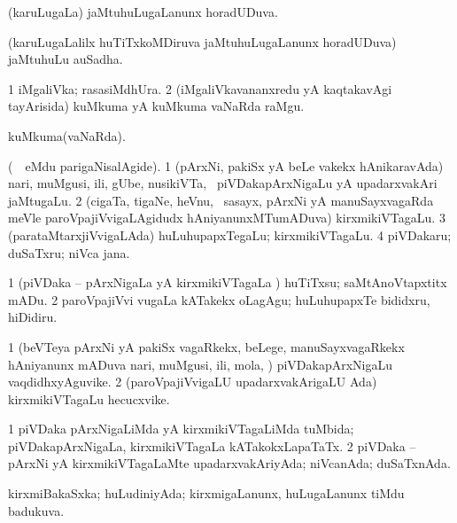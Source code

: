 \bentry
{} 
\gl{\gu}
\expl{}
\bmng
 (karuLugaLa) jaMtuhuLugaLanunx horadUDuva. 
\emng
\eentry

\bentry
{} 
\gl{\nA}
\expl{}
\bmng
 (karuLugaLalilx huTiTxkoMDiruva jaMtuhuLugaLanunx horadUDuva) jaMtuhuLu auSadha. 
\emng
\eentry

\bentry
{} 
\gl{\nA}
\expl{}
\bmng
\bnum
\num{1} iMgaliVka; rasasiMdhUra. 
\num{2} (iMgaliVkavananxredu yA kaqtakavAgi tayArisida) kuMkuma yA kuMkuma vaNaRda raMgu. 
\enum
\emng
\eentry

\bentry
{} 
\gl{\gu}
\expl{}
\bmng
 kuMkuma(vaNaRda). 
\emng
\eentry

\bentry
{} 
\gl{\nA}
\expl{}
\bmng
 (\sA\ \bava\ eMdu parigaNisalAgide). 
\bnum
\num{1} (pArxNi, pakiSx yA beLe \mo vakekx hAnikaravAda) nari, muMgusi, ili, gUbe, nusikiVTa, \mo\ piVDakapArxNigaLu yA upadarxvakAri jaMtugaLu. 
\num{2} (cigaTa, tigaNe, heVnu, \mo\ sasayx, pArxNi yA manuSayxvagaRda meVle paroVpajiVvigaLAgidudx hAniyanunxMTumADuva) kirxmikiVTagaLu. 
\num{3} (parataMtarxjiVvigaLAda) huLuhupapxTegaLu; kirxmikiVTagaLu. 
\num{4} piVDakaru; duSaTxru; niVca jana. 
\enum
\emng
\eentry

\bentry
{} 
\gl{\akirx}
\expl{}
\bmng
\bnum
\num{1} (piVDaka -- pArxNigaLa yA kirxmikiVTagaLa \vi) huTiTxsu; saMtAnoVtapxtitx mADu. 
\num{2} paroVpajiVvi \mo vugaLa kATakekx oLagAgu; huLuhupapxTe bididxru, hiDidiru. 
\enum
\emng
\eentry

\bentry
{} 
\gl{\nA}
\expl{}
\bmng
\bnum
\num{1} (beVTeya pArxNi yA pakiSx vagaRkekx, beLege, manuSayxvagaRkekx hAniyanunx mADuva nari, muMgusi, ili, mola, \mo) piVDakapArxNigaLu vaqdidhxyAguvike. 
\num{2} (paroVpajiVvigaLU upadarxvakArigaLU Ada) kirxmikiVTagaLu hecucxvike. 
\enum
\emng
\eentry

\bentry
{} 
\gl{\gu}
\expl{}
\bmng
\bnum
\num{1} piVDaka pArxNigaLiMda yA kirxmikiVTagaLiMda tuMbida; piVDakapArxNigaLa, kirxmikiVTagaLa kATakokxLapaTaTx. 
\num{2} piVDaka -- pArxNi yA kirxmikiVTagaLaMte upadarxvakAriyAda; niVcanAda; duSaTxnAda. 
\enum
\emng
\eentry

\bentry
{} 
\gl{\gu}
\expl{}
\bmng
 kirxmiBakaSxka; huLudiniyAda; kirxmigaLanunx, huLugaLanunx tiMdu badukuva. 
\emng
\eentry

